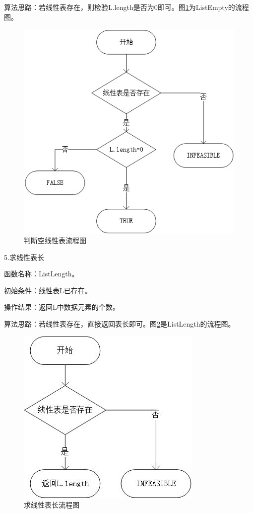 \documentclass[supercite]{Experimental_Report}
\theoremstyle{definition}
\begin{document}
算法思路：若线性表存在，则检验L.length是否为0即可。图\ref{fig1-4}为ListEmpty的流程图。
\begin{figure}[htb] %
	\begin{center}
		\includegraphics[scale=0.8]{./images/顺序表/empty.jpg}
		\caption{判断空线性表流程图}
		\label{fig1-4}
	\end{center}
\end{figure}

5.求线性表长

函数名称：ListLength。

初始条件：线性表L已存在。

操作结果：返回L中数据元素的个数。

算法思路：若线性表存在，直接返回表长即可。图\ref{fig1-5}是ListLength的流程图。
\begin{figure}[htb] %
	\begin{center}
		\includegraphics[scale=0.9]{./images/顺序表/length.jpg}
		\caption{求线性表长流程图}
		\label{fig1-5}
	\end{center}
\end{figure}
\end{document}
